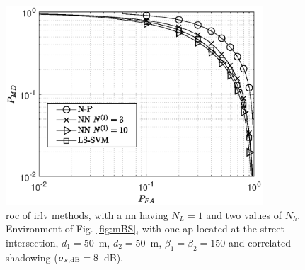 \documentclass[final,twocolumn]{IEEEtran}
\begin{document}
\begin{figure}[t]
    \centering
    \includegraphics[width=9.6cm]{res_NP_approx_SVM.eps}
    \caption{\ac{roc} of \ac{irlv} methods, with a \ac{nn} having $N_L=1$ and two values of $N_h$. Environment of Fig. \ref{fig:mBS}, with one \ac{ap} located at the street intersection, $d_1 = 50$~m, $d_2 = 50$~m, $\beta_1 = \beta_2 = 150$ and correlated shadowing ($\sigma_{s, {\rm dB}} = 8$~dB).}
    \label{fig:trueMap}
\end{figure}
\end{document}
